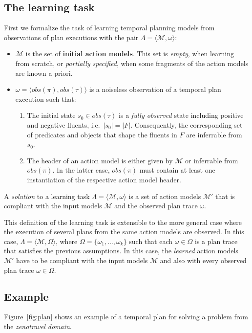 \documentclass[letterpaper]{article} %
\newcommand{\tup}[1]{{\langle #1 \rangle}}
\begin{document}
\subsection{The learning task}
First we formalize the task of learning temporal planning models from observations of plan executions with the pair $\Lambda=\tup{\mathcal{M},\omega}$:
\begin{itemize}
\item $\mathcal{M}$ is the set of {\bf initial action models}. This set is {\em empty}, when learning from scratch, or {\em partially specified}, when some fragments of the action models are known a priori.
\item $\omega=\tup{obs(\pi),obs(\tau)}$ is a noiseless observation of a temporal plan execution such that:
\begin{enumerate}
\item The initial state $s_0\in obs(\tau)$ is a {\em fully observed} state including positive and negative fluents, i.e.~$|s_0|=|F|$. Consequently, the corresponding set of predicates and objects that shape the fluents in $F$ are inferrable from $s_0$.
\item The header of an action model is either given by $\mathcal{M}$ or inferrable from $obs(\pi)$. In the latter case, $obs(\pi)$ must contain at least one instantiation of the respective action model header.
\end{enumerate}
\end{itemize}

A {\em solution} to a learning task $\Lambda=\tup{\mathcal{M},\omega}$ is a set of action models $\mathcal{M}'$ that is compliant with the input models $\mathcal{M}$ and the observed plan trace $\omega$.

This definition of the learning task is extensible to the more general case where the execution of several plans from the same action models are observed. In this case, $\Lambda=\tup{\mathcal{M},\Omega}$, where $\Omega=\{\omega_1,\ldots,\omega_{k}\}$ such that each $\omega\in \Omega$ is a plan trace that satisfies the previous assumptions. In this case, the {\em learned} action models $\mathcal{M}'$ have to be compliant with the input models $\mathcal{M}$ and also with every observed plan trace $\omega\in \Omega$.

\subsection{Example}
Figure~\ref{fig:plan} shows an example of a temporal plan for solving a problem from the {\em zenotravel domain}.
\end{document}
